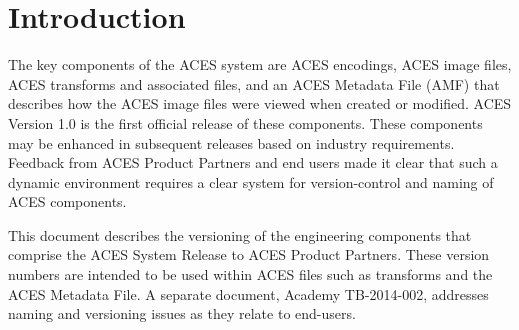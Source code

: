 \unnumberedformat	    %
\chapter{Introduction} 	%

The key components of the ACES system are ACES encodings, ACES image files, ACES transforms and associated files, and an ACES Metadata File (AMF) that describes how the ACES image files were viewed when created or modified. ACES Version 1.0 is the first official release of these components. These components may be enhanced in subsequent releases based on industry requirements. Feedback from ACES Product Partners and end users made it clear that such a dynamic environment requires a clear system for version-control and naming of ACES components.

This document describes the versioning of the engineering components that comprise the ACES System Release to ACES Product Partners. These version numbers are intended to be used within ACES files such as transforms and the ACES Metadata File. A separate document, Academy TB-2014-002, addresses naming and versioning issues as they relate to end-users.